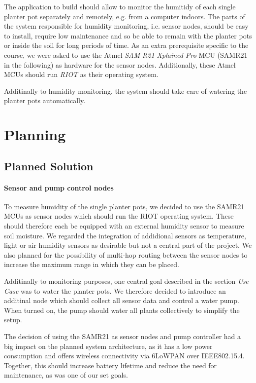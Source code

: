 \documentclass[11pt,paper=a4,parskip=half]{scrartcl}
\begin{document}
  The application to build should allow to monitor the humitidy of each single
  planter pot separately and remotely, e.g. from a computer indoors. The parts
  of the system responsible for humidity monitoring, i.e. sensor nodes, should
  be easy to install, require low maintenance and so be able to remain with the
  planter pots or inside the soil for long periods of time. As an extra
  prerequisite specific to the course, we were asked to use the Atmel
  \textit{SAM R21 Xplained Pro} MCU (SAMR21 in the following) as hardware for
  the sensor nodes.  Additionally, these Atmel MCUs should run \textit{RIOT} as
  their operating system.

  Additinally to humidity monitoring, the system should take care of watering
  the planter pots automatically.

\section{Planning}
\subsection{Planned Solution}
  \paragraph{Sensor and pump control nodes} To measure humidity of the single
  planter pots, we decided to use the SAMR21 MCUs as sensor nodes which should
  run the RIOT operating system. These should therefore each be equipped with
  an external humidity sensor to measure soil moisture. We regarded the
  integration of addidional sensors as temperature, light or air humidity
  sensors as desirable but not a central part of the project. We also planned
  for the possibility of multi-hop routing between the sensor nodes to increase
  the maximum range in which they can be placed.

  Additinally to monitoring purposes, one central goal described in the section
  \textit{Use Case} was to water the planter pots. We therefore decided  to
  introduce an additinal node which should collect all sensor data and control
  a water pump. When turned on, the pump should water all plants collectively
  to simplify the setup.

  The decision of using the SAMR21 as sensor nodes and pump controller had a
  big impact on the planned system architecture, as it has a low power
  consumption and offers wireless connectivity via 6LoWPAN over IEEE802.15.4.
  Together, this should increase battery lifetime and reduce the need for
  maintenance, as was one of our set goals.
\end{document}
